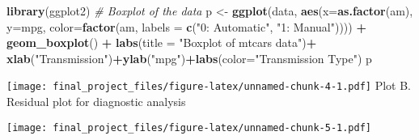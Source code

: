 \documentclass[]{article}
\newenvironment{Shaded}{\begin{snugshade}}{\end{snugshade}}
\newcommand{\KeywordTok}[1]{\textcolor[rgb]{0.13,0.29,0.53}{\textbf{#1}}}
\newcommand{\DataTypeTok}[1]{\textcolor[rgb]{0.13,0.29,0.53}{#1}}
\newcommand{\StringTok}[1]{\textcolor[rgb]{0.31,0.60,0.02}{#1}}
\newcommand{\CommentTok}[1]{\textcolor[rgb]{0.56,0.35,0.01}{\textit{#1}}}
\newcommand{\OperatorTok}[1]{\textcolor[rgb]{0.81,0.36,0.00}{\textbf{#1}}}
\newcommand{\NormalTok}[1]{#1}
\begin{document}
\begin{Shaded}
\begin{Highlighting}[]
\KeywordTok{library}\NormalTok{(ggplot2)}
\CommentTok{# Boxplot of the data}
\NormalTok{p <-}\StringTok{ }\KeywordTok{ggplot}\NormalTok{(data, }\KeywordTok{aes}\NormalTok{(}\DataTypeTok{x=}\KeywordTok{as.factor}\NormalTok{(am), }\DataTypeTok{y=}\NormalTok{mpg, }\DataTypeTok{color=}\KeywordTok{factor}\NormalTok{(am, }\DataTypeTok{labels =} \KeywordTok{c}\NormalTok{(}\StringTok{"0: Automatic"}\NormalTok{, }\StringTok{"1: Manual"}\NormalTok{)))) }\OperatorTok{+}\StringTok{ }\KeywordTok{geom_boxplot}\NormalTok{() }\OperatorTok{+}\StringTok{ }\KeywordTok{labs}\NormalTok{(}\DataTypeTok{title =} \StringTok{"Boxplot of mtcars data"}\NormalTok{)}\OperatorTok{+}\StringTok{ }\KeywordTok{xlab}\NormalTok{(}\StringTok{"Transmission"}\NormalTok{)}\OperatorTok{+}\KeywordTok{ylab}\NormalTok{(}\StringTok{"mpg"}\NormalTok{)}\OperatorTok{+}\KeywordTok{labs}\NormalTok{(}\DataTypeTok{color=}\StringTok{"Transmission Type"}\NormalTok{)}
\NormalTok{p}
\end{Highlighting}
\end{Shaded}

\texttt{[image: final\_project\_files/figure-latex/unnamed-chunk-4-1.pdf]}
Plot B. Residual plot for diagnostic analysis

\begin{Shaded}
\end{Shaded}

\texttt{[image: final\_project\_files/figure-latex/unnamed-chunk-5-1.pdf]}
\end{document}

